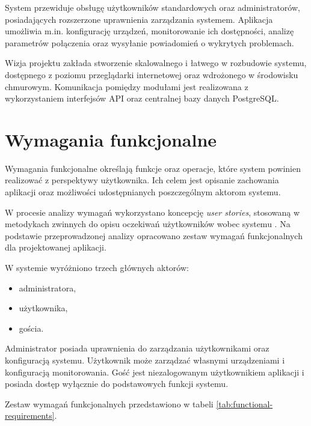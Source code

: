 System przewiduje obsługę użytkowników standardowych oraz administratorów, posiadających rozszerzone uprawnienia zarządzania systemem. Aplikacja umożliwia m.in. konfigurację urządzeń, monitorowanie ich dostępności, analizę parametrów połączenia oraz wysyłanie powiadomień o wykrytych problemach.

Wizja projektu zakłada stworzenie skalowalnego i łatwego w rozbudowie systemu, dostępnego z poziomu przeglądarki internetowej oraz wdrożonego w środowisku chmurowym. Komunikacja pomiędzy modułami jest realizowana z wykorzystaniem interfejsów API oraz centralnej bazy danych PostgreSQL.

\section{Wymagania funkcjonalne}

Wymagania funkcjonalne określają funkcje oraz operacje, które system powinien realizować z perspektywy użytkownika. Ich celem jest opisanie zachowania aplikacji oraz możliwości udostępnianych poszczególnym aktorom systemu. 

W procesie analizy wymagań wykorzystano koncepcję \emph{user stories}, stosowaną w metodykach zwinnych do opisu oczekiwań użytkowników wobec systemu \cite{www3}. Na podstawie przeprowadzonej analizy opracowano zestaw wymagań funkcjonalnych dla projektowanej aplikacji.

W systemie wyróżniono trzech głównych aktorów:
\begin{itemize}
	\item administratora,
	\item użytkownika,
	\item gościa.
\end{itemize}

Administrator posiada uprawnienia do zarządzania użytkownikami oraz konfiguracją systemu. Użytkownik może zarządzać własnymi urządzeniami i konfiguracją monitorowania. Gość jest niezalogowanym użytkownikiem aplikacji i posiada dostęp wyłącznie do podstawowych funkcji systemu.

Zestaw wymagań funkcjonalnych przedstawiono w tabeli \ref{tab:functional-requirements}.

